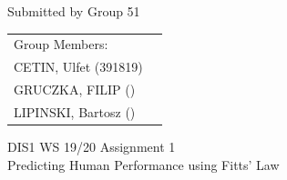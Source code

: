 \documentclass[a4paper,9pt,oneside]{scrreprt}
\begin{document}
\begin{center}
	Submitted by Group 51
	
	\bigskip
	
	\begin{tabular}{ll}
	Group Members: \\
	CETIN, Ulfet (391819) \\
	GRUCZKA, FILIP () \\
	LIPINSKI, Bartosz () \\
	\end{tabular}

	\bigskip
	
	DIS1 WS 19/20 Assignment 1\\
	Predicting Human Performance using Fitts' Law
	
\end{center}



\bigskip 
\end{document}
